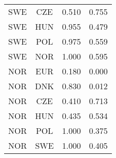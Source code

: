 \begin{table}[!h]
\begin{tabular}[t]{cccc}
SWE & CZE & 0.510 & 0.755\\
SWE & HUN & 0.955 & 0.479\\
SWE & POL & 0.975 & 0.559\\
\addlinespace
SWE & NOR & 1.000 & 0.595\\
NOR & EUR & 0.180 & 0.000\\
NOR & DNK & 0.830 & 0.012\\
NOR & CZE & 0.410 & 0.713\\
NOR & HUN & 0.435 & 0.534\\
\addlinespace
NOR & POL & 1.000 & 0.375\\
NOR & SWE & 1.000 & 0.405\\
\bottomrule
\end{tabular}
\end{table}
